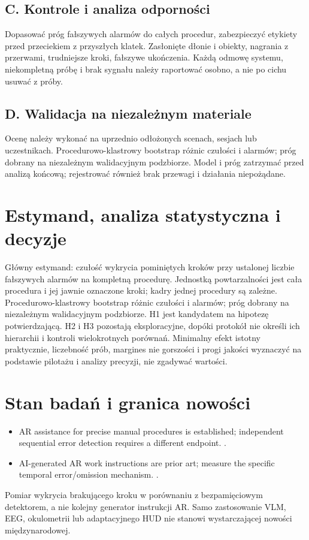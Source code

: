 \documentclass[11pt,a4paper]{article}
\begin{document}
\subsection{C. Kontrole i analiza odporności}
Dopasować próg fałszywych alarmów do całych procedur, zabezpieczyć etykiety przed przeciekiem z przyszłych klatek. Zasłonięte dłonie i obiekty, nagrania z przerwami, trudniejsze kroki, fałszywe ukończenia. Każdą odmowę systemu, niekompletną próbę i brak sygnału należy raportować osobno, a nie po cichu usuwać z próby.

\subsection{D. Walidacja na niezależnym materiale}
Ocenę należy wykonać na uprzednio odłożonych scenach, sesjach lub uczestnikach. Procedurowo-klastrowy bootstrap różnic czułości i alarmów; próg dobrany na niezależnym walidacyjnym podzbiorze. Model i próg zatrzymać przed analizą końcową; rejestrować również brak przewagi i działania niepożądane.

\section{Estymand, analiza statystyczna i decyzje}
Główny estymand: czułość wykrycia pominiętych kroków przy ustalonej liczbie fałszywych alarmów na kompletną procedurę. Jednostką powtarzalności jest cała procedura i jej jawnie oznaczone kroki; kadry jednej procedury są zależne. Procedurowo-klastrowy bootstrap różnic czułości i alarmów; próg dobrany na niezależnym walidacyjnym podzbiorze. H1 jest kandydatem na hipotezę potwierdzającą. H2 i H3 pozostają eksploracyjne, dopóki protokół nie określi ich hierarchii i kontroli wielokrotnych porównań. Minimalny efekt istotny praktycznie, liczebność prób, margines nie gorszości i progi jakości wyznaczyć na podstawie pilotażu i analizy precyzji, nie zgadywać wartości.

\section{Stan badań i granica nowości}
\begin{itemize}
\item AR assistance for precise manual procedures is established; independent sequential error detection requires a different endpoint. \cite{xrprior1}.
\item AI-generated AR work instructions are prior art; measure the specific temporal error/omission mechanism. \cite{xrprior2}.
\end{itemize}
Pomiar wykrycia brakującego kroku w porównaniu z bezpamięciowym detektorem, a nie kolejny generator instrukcji AR. Samo zastosowanie VLM, EEG, okulometrii lub adaptacyjnego HUD nie stanowi wystarczającej nowości międzynarodowej.
\end{document}
